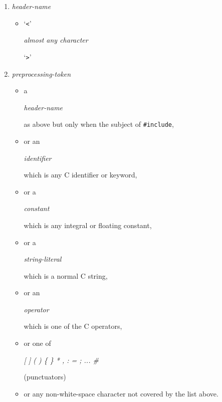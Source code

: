   \begin{enumerate}
   \item \begin{center}\textit{header-name}\end{center}

    \begin{itemize}
     \item `\texttt{<}' \begin{center}\textit{almost any character}\end{center}

      `\texttt{>}'
    \end{itemize}
   
   \item \begin{center}\textit{preprocessing-token}\end{center}

    \begin{itemize}
     \item a \begin{center}\textit{header-name}\end{center}

 as above but only when the subject of
      \texttt{\#include},
     \item or an \begin{center}\textit{identifier}\end{center}

 which is any C identifier or
      keyword,
     \item or a \begin{center}\textit{constant}\end{center}

 which is any integral or floating
      constant,
     \item or a \begin{center}\textit{string-literal}\end{center}

 which is a normal C string,
     \item or an \begin{center}\textit{operator}\end{center}

 which is one of the C operators,
     \item or one of \begin{center}\textit{[ ] ( ) \{ \} * , : = ; ... \#}\end{center}

 (punctuators)
     \item or any non-white-space character not covered by the list above.
    \end{itemize}
   
  \end{enumerate}

